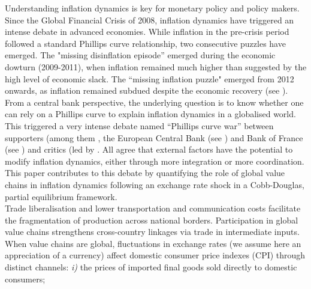 \documentclass[11pt,a4paper]{article}
\begin{document}

Understanding inflation dynamics is key for monetary policy and policy makers.
Since the Global Financial Crisis of 2008, inflation dynamics have triggered an intense debate in advanced economies.
While inflation in the pre-crisis period followed a standard Phillips curve relationship, two consecutive puzzles have emerged. 
The "missing disinflation episode” emerged during the economic dowturn (2009-2011), when inflation remained much higher than suggested by the high level of economic slack. 
The “missing inflation puzzle" emerged from 2012 onwards, as inflation remained subdued despite the economic recovery (see \cite{Ciccarelli2010,Ball2011, Coibion2015}). 
From a central bank perspective, the underlying question is to know whether one can rely on a Phillips curve to explain inflation dynamics in a globalised world.
This triggered a very intense debate named “Phillips curve war” between supporters (among them \cite{Blanchard2016}, the European Central Bank (see \cite{Eser2020}) and Bank of France (see \cite{Berson2018}) and critics (led by \cite{Farmer2018}.
All agree that external factors have the potential to modify inflation dynamics, either through more integration or more coordination.
This paper contributes to this debate by quantifying the role of global value chains in inflation dynamics following an exchange rate shock in a Cobb-Douglas, partial equilibrium framework.
\\
Trade liberalisation and lower transportation and communication costs facilitate the fragmentation of production across national borders.
Participation in global value chains strengthens cross-country linkages via trade in intermediate inputs.
When value chains are global, fluctuations in exchange rates (we assume here an appreciation of a currency) aﬀect domestic consumer price indexes (CPI) through distinct channels: \textit{i)} the prices of imported ﬁnal goods sold directly to domestic consumers;
\end{document}
